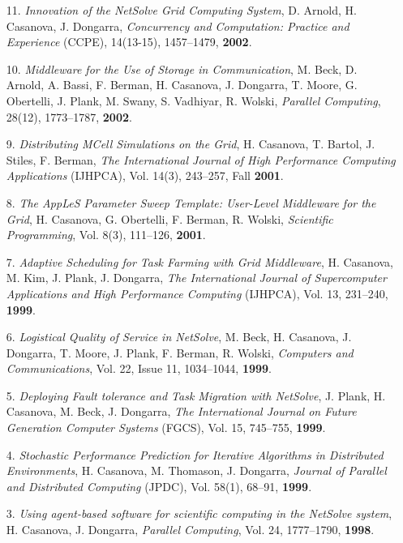 \begin{enumerate}
\item[11.]
{\it Innovation of the NetSolve Grid Computing System}, D. Arnold,
H. Casanova, J. Dongarra, \emph{Concurrency and Computation: Practice
and Experience} (CCPE), 14(13-15), 1457--1479, {\bf 2002}. 

\item[10.]
{\it Middleware for the Use of Storage in Communication}, M. Beck,
D. Arnold, A. Bassi, F. Berman, H. Casanova, J. Dongarra, T. Moore,
G. Obertelli, J. Plank, M. Swany, S. Vadhiyar, R. Wolski, \emph{Parallel
Computing}, 28(12), 1773--1787, {\bf 2002}.

\item[9.]
{\it Distributing MCell Simulations on the Grid}, H. Casanova, T. Bartol,
J. Stiles, F. Berman, \emph{The International Journal of High Performance
Computing Applications} (IJHPCA), Vol. 14(3), 243--257, Fall {\bf 2001}.

\item[8.]
{\it The AppLeS Parameter Sweep Template: User-Level Middleware for the
Grid}, H. Casanova, G. Obertelli, F. Berman, R. Wolski, \emph{Scientific
Programming}, Vol. 8(3), 111--126, {\bf 2001}.  

\item[7.]
{\it Adaptive Scheduling for Task Farming with Grid Middleware},
H. Casanova, M. Kim, J. Plank, J. Dongarra, \emph{The International
Journal of Supercomputer Applications and High Performance Computing}
(IJHPCA), Vol. 13, 231--240, {\bf 1999}.

\item[6.]
{\it Logistical Quality of Service in NetSolve}, M. Beck, H. Casanova,
J. Dongarra, T. Moore, J. Plank, F. Berman, R. Wolski, \emph{Computers
and Communications}, Vol. 22, Issue 11, 1034--1044, {\bf 1999}.

\item[5.]
{\it Deploying Fault tolerance and Task Migration with NetSolve},
J. Plank, H. Casanova, M. Beck, J. Dongarra, \emph{The International
Journal on Future Generation Computer Systems} (FGCS), Vol. 15, 745--755,
{\bf 1999}.

\item[4.]
{\it Stochastic Performance Prediction for Iterative Algorithms in
Distributed Environments}, H. Casanova, M. Thomason, J. Dongarra,
\emph{Journal of Parallel and Distributed Computing} (JPDC), Vol. 58(1),
68--91, {\bf 1999}.

\item[3.]
{\it Using agent-based software for scientific computing in the NetSolve
system}, H. Casanova, J. Dongarra, \emph{Parallel Computing}, Vol. 24,
1777--1790, {\bf 1998}.


\end{enumerate}
